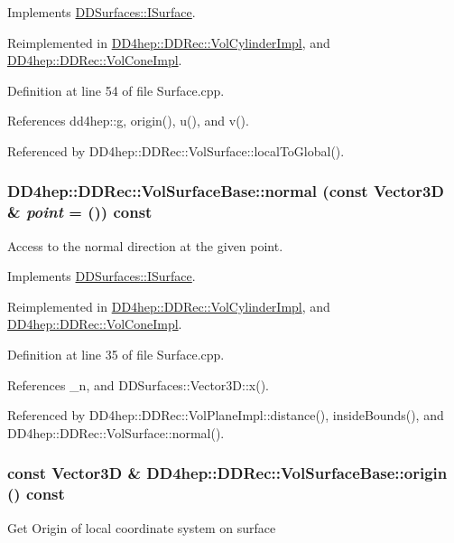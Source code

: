 Implements \hyperlink{class_d_d_surfaces_1_1_i_surface_a39651d79f7969ac7402a6e2cfc37803c}{DDSurfaces::ISurface}.

Reimplemented in \hyperlink{class_d_d4hep_1_1_d_d_rec_1_1_vol_cylinder_impl_ae0918a43a874b96dc2f55506d4f509a2}{DD4hep::DDRec::VolCylinderImpl}, and \hyperlink{class_d_d4hep_1_1_d_d_rec_1_1_vol_cone_impl_a1428d72f28ed90522cdaa6bb4d855dce}{DD4hep::DDRec::VolConeImpl}.

Definition at line 54 of file Surface.cpp.

References dd4hep::g, origin(), u(), and v().

Referenced by DD4hep::DDRec::VolSurface::localToGlobal().\hypertarget{class_d_d4hep_1_1_d_d_rec_1_1_vol_surface_base_a0689bccd5a024798609f3ce1b39c7d61}{
\subsubsection[{normal}]{ DD4hep::DDRec::VolSurfaceBase::normal (const {\bf Vector3D} \& {\em point} = {()}) const}}
\label{class_d_d4hep_1_1_d_d_rec_1_1_vol_surface_base_a0689bccd5a024798609f3ce1b39c7d61}


Access to the normal direction at the given point. 

Implements \hyperlink{class_d_d_surfaces_1_1_i_surface_abbead4b1af2864d6d3f61270543310a0}{DDSurfaces::ISurface}.

Reimplemented in \hyperlink{class_d_d4hep_1_1_d_d_rec_1_1_vol_cylinder_impl_a1863142729883b2e20c78dadabd04927}{DD4hep::DDRec::VolCylinderImpl}, and \hyperlink{class_d_d4hep_1_1_d_d_rec_1_1_vol_cone_impl_aea04fc521c39ffc8e97ae3f700533e7a}{DD4hep::DDRec::VolConeImpl}.

Definition at line 35 of file Surface.cpp.

References \_\-n, and DDSurfaces::Vector3D::x().

Referenced by DD4hep::DDRec::VolPlaneImpl::distance(), insideBounds(), and DD4hep::DDRec::VolSurface::normal().\hypertarget{class_d_d4hep_1_1_d_d_rec_1_1_vol_surface_base_a8c0138c1595c6acbc94d5d7af57d468a}{
\subsubsection[{origin}]{\setlength{\rightskip}{0pt plus 5cm}const {\bf Vector3D} \& DD4hep::DDRec::VolSurfaceBase::origin () const}}
\label{class_d_d4hep_1_1_d_d_rec_1_1_vol_surface_base_a8c0138c1595c6acbc94d5d7af57d468a}
Get Origin of local coordinate system on surface 

